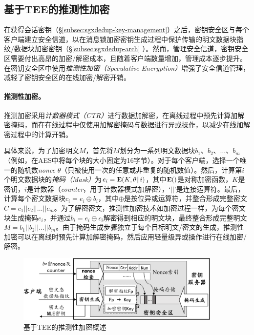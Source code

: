 \subsection{基于TEE的推测性加密}
\label{subsec:sgxdedup-encryption}

在获得会话密钥（\S\ref{subsec:sgxdedup-key-management}）之后，密钥安全区与每个客户端建立安全信道，以在消息锁加密密钥生成过程中保护传输的明文数据块指纹/数据块加密密钥（\S\ref{subsec:sgxdedup-arch} ）。然而，管理安全信道，密钥安全区需要付出高昂的加密/解密成本，且随着客户端数量增加，管理成本逐步提升。\sysnameS 在密钥安全区中使用\textit{推测性加密（Speculative Encryption）}\cite{eduardo2019Speculative}增强了安全信道管理，减轻了密钥安全区的在线加密/解密开销。

\paragraph*{推测性加密。}推测加密\cite{eduardo2019Speculative}采用\textit{计数器模式（CTR）}\cite{counter}进行数据加解密，在离线过程中预先计算加解密掩码，而在在线过程中仅使用加解密掩码与数据进行异或操作，以减少在线加解密过程中的计算开销。

具体来说，为了加密明文$M$，首先将$M$划分为一系列明文数据块$b_1、b_2、\ldots、b_m$（例如，在AES中将每个块的大小固定为16字节）。对于每个客户端，选择一个唯一的随机数\textit{nonce} $\theta$（只被使用一次的任意或非重复的随机数值）。然后，计算第$i$个明文数据块的\textit{掩码（Mask）}为$e_i = {\bf E}(K, \theta || i)$，其中${\bf E}()$是对称加密函数，$K$是密钥，$i$是计数器（\textit{counter}，用于计数器模式加解密），‘$||$’是连接运算符。最后，计算每个密文数据块$c_i = e_i \oplus b_i $，其中$\oplus$是按位异或运算符，并整合形成完整密文$C = c_1 || c_2 || \ldots || c_m$。为了解密密文，推测性加密技术如加密过程一样，为每个密文块生成掩码$e_i$，并通过$b_i = e_i \oplus c_i $解密得到相应的明文块，最终整合形成完整明文$M = b_1 || b_2 || \ldots || b_m$。由于掩码生成步骤独立于每个目标明文/密文的生成，推测性加密可以在离线时预先计算加解密掩码，然后应用轻量级异或操作进行在线加密/解密。

\begin{figure}[t]
\centering
\includegraphics[width=0.9\textwidth]{pic/sgxdedup/key-enclave-arch.pdf}
\caption{基于TEE的推测性加密概述}
\label{fig:sgxdedup-SpecEnc}
\end{figure}

